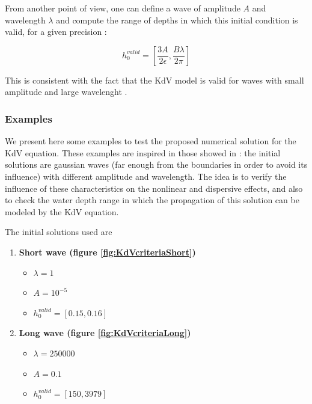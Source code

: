 \indent From another point of view, one can define a wave of amplitude $A$ and wavelength $\lambda$ and compute the range of depths in which this initial condition is valid, for a given precision : 

\begin{equation} 
\label{eq:hvalid}
h_0^{valid} = \left[ \frac{3A}{2\epsilon}, \frac{B\lambda}{2\pi}\right]
\end{equation}

\indent This is consistent with the fact that the KdV model is valid for waves with small amplitude and large wavelenght \cite{BBM1971}.

\subsubsection{Examples}

\indent We present here some examples to test the proposed numerical solution for the KdV equation. These examples are inspired in those showed in \cite{conservationLaws2002}: the initial solutions are gaussian waves (far enough from the boundaries in order to avoid its influence) with different amplitude and wavelength. The idea is to verify the influence of these characteristics on the nonlinear and dispersive effects, and also to check the water depth range in which the propagation of this solution can be modeled by the KdV equation. 

\indent The initial solutions used are

\begin{enumerate}
	\item \textbf{Short wave (figure \ref{fig:KdVcriteriaShort})} %
		\begin{itemize}
			\item $\lambda = 1$
			\item $ A = 10^{-5}$
			\item $ h_0^{valid} = [0.15, 0.16] $
		\end{itemize}
	\item \textbf{Long wave (figure \ref{fig:KdVcriteriaLong})} %
		\begin{itemize}
			\item $\lambda = 250000$
			\item $ A = 0.1$
			\item $ h_0^{valid} = [150, 3979] $
		\end{itemize}
\end{enumerate}

